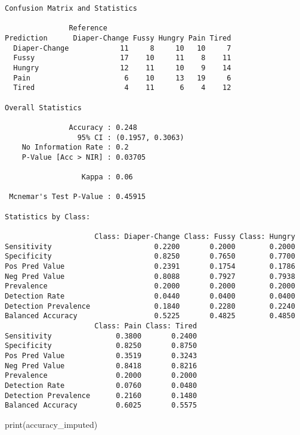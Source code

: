 \documentclass[
  letterpaper,
  DIV=11,
  numbers=noendperiod]{scrartcl}
\newenvironment{Shaded}{\begin{snugshade}}{\end{snugshade}}
\newcommand{\FunctionTok}[1]{\textcolor[rgb]{0.28,0.35,0.67}{#1}}
\newcommand{\NormalTok}[1]{\textcolor[rgb]{0.00,0.23,0.31}{#1}}
\begin{document}
\begin{verbatim}
Confusion Matrix and Statistics

               Reference
Prediction      Diaper-Change Fussy Hungry Pain Tired
  Diaper-Change            11     8     10   10     7
  Fussy                    17    10     11    8    11
  Hungry                   12    11     10    9    14
  Pain                      6    10     13   19     6
  Tired                     4    11      6    4    12

Overall Statistics
                                          
               Accuracy : 0.248           
                 95% CI : (0.1957, 0.3063)
    No Information Rate : 0.2             
    P-Value [Acc > NIR] : 0.03705         
                                          
                  Kappa : 0.06            
                                          
 Mcnemar's Test P-Value : 0.45915         

Statistics by Class:

                     Class: Diaper-Change Class: Fussy Class: Hungry
Sensitivity                        0.2200       0.2000        0.2000
Specificity                        0.8250       0.7650        0.7700
Pos Pred Value                     0.2391       0.1754        0.1786
Neg Pred Value                     0.8088       0.7927        0.7938
Prevalence                         0.2000       0.2000        0.2000
Detection Rate                     0.0440       0.0400        0.0400
Detection Prevalence               0.1840       0.2280        0.2240
Balanced Accuracy                  0.5225       0.4825        0.4850
                     Class: Pain Class: Tired
Sensitivity               0.3800       0.2400
Specificity               0.8250       0.8750
Pos Pred Value            0.3519       0.3243
Neg Pred Value            0.8418       0.8216
Prevalence                0.2000       0.2000
Detection Rate            0.0760       0.0480
Detection Prevalence      0.2160       0.1480
Balanced Accuracy         0.6025       0.5575
\end{verbatim}

\begin{Shaded}
\begin{Highlighting}[]
\FunctionTok{print}\NormalTok{(accuracy\_imputed)}
\end{Highlighting}
\end{Shaded}
\end{document}
